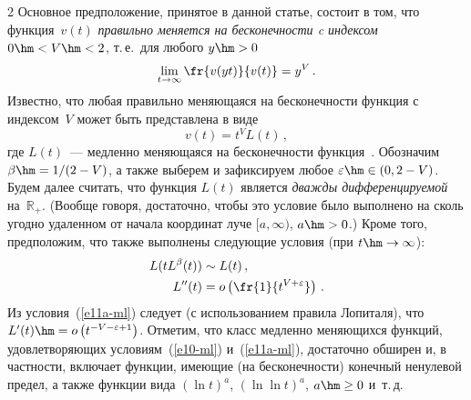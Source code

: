 \begin{multicols}{2}
Основное предположение, принятое в данной статье, состоит в том, что
функция~$v(t)$ {\it правильно меняется  на бесконечности c
индексом} $0\hm<V\hm<2$, т.\,е.\ для любого $y\hm>0$
$$
\lim\limits_{t \to \infty} \fr{v(yt) }{v(t)}=y^V\,.
$$
Известно,  что любая правильно меняющаяся на бесконечности функция
с индексом~$V$ может быть представлена в виде
\begin{equation*}
v(t)=t^V L(t)\,,
\end{equation*}
где $L(t)$~--- медленно меняющаяся на беско\-неч\-ности функция~\cite{Seneta}. 
Обозначим $\beta\hm={1}/(2-V)$, а также выберем и
зафиксируем любое $\varepsilon \hm\in (0,2-V)$. Будем далее считать,
что функция $L(t)$ является {\it дважды дифференцируемой} на~$\mathbb{R}_+$. 
(Вообще говоря, достаточно, чтобы это условие было
выполнено  на сколь угодно удаленном от начала координат луче
$[a,\infty)$, $a\hm>0$.) Кроме того, предположим, что также
выполнены следующие условия (при $t \hm\to \infty$):
\begin{align}
L(tL^\beta(t))& \sim L(t)\,,\label{e10-ml}\\
L''(t)&=o\left( \fr{1}{t^{V+\varepsilon}} \right)\,.\label{e11a-ml}
\end{align}
Из условия~(\ref{e11a-ml}) следует (с использованием правила Лопиталя),
что $L'(t)\hm=o\left(t^{-V-\varepsilon+1} \right)$. Отметим, что класс
медленно меняющихся функций, удовлетворяющих условиям~(\ref{e10-ml}) и~(\ref{e11a-ml}), 
достаточно обширен и, в частности, включает функции,
имеющие (на бесконечности) конечный ненулевой предел, а также
функции вида $(\ln t)^a$, $(\ln\ln t)^a$, $a\hm\ge 0$ и~т.\,д.


\end{multicols}

